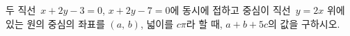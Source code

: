 두 직선~$x+2y-3=0$, $x+2y-7=0$에 동시에 접하고 중심이 직선~$y=2x$ 위에 있는 원의 중심의 좌표를 $(a,\,b)$, 넓이를 $c\pi$라 할 때, $a+b+5c$의 값을 구하시오.
